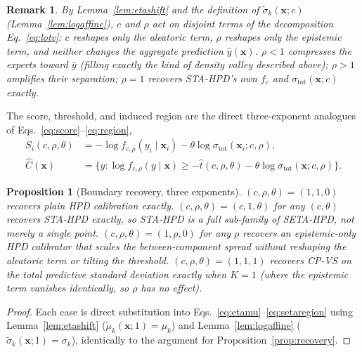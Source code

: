 \documentclass[10pt,twocolumn,a4paper]{article}
\newtheorem{proposition}{Proposition}
\newtheorem{remark}{Remark}
\begin{document}
\begin{remark}
By Lemma~\ref{lem:etashift} and the definition of $\tilde\sigma_k(\bm x;c)$ (Lemma~\ref{lem:logaffine}),
$c$ and $\rho$ act on disjoint terms of the decomposition Eq.~\eqref{eq:lotv}: $c$ reshapes only the
aleatoric term, $\rho$ reshapes only the epistemic term, and neither changes the aggregate
prediction $\hat y(\bm x)$. $\rho<1$ compresses the experts toward $\hat y$ (filling exactly the kind
of density valley described above); $\rho>1$ amplifies their separation; $\rho=1$ recovers STA-HPD's
own $f_c$ and $\sigma_{\mathrm{tot}}(\bm x;c)$ exactly.
\end{remark}

The score, threshold, and induced region are the direct three-exponent analogues of
Eqs.~\eqref{eq:score}--\eqref{eq:region},
\begin{align}
S_i(c,\rho,\theta) &= -\log f_{c,\rho}(y_i\mid\bm x_i) - \theta\log\sigma_{\mathrm{tot}}(\bm x_i;c,\rho), \label{eq:setascore}\\
\hat C(\bm x) &= \Big\{y:\log f_{c,\rho}(y\mid\bm x)\ge -\hat t(c,\rho,\theta) - \theta\log\sigma_{\mathrm{tot}}(\bm x;c,\rho)\Big\}. \label{eq:setaregion}
\end{align}

\begin{proposition}[Boundary recovery, three exponents]
\label{prop:setarecovery}
$(c,\rho,\theta)=(1,1,0)$ recovers plain HPD calibration exactly. $(c,\rho,\theta)=(c,1,\theta)$ for
any $(c,\theta)$ recovers STA-HPD exactly, so STA-HPD is a full sub-family of SETA-HPD, not merely a
single point. $(c,\rho,\theta)=(1,\rho,0)$ for any $\rho$ recovers an epistemic-only HPD calibrator
that scales the between-component spread without reshaping the aleatoric term or tilting the
threshold. $(c,\rho,\theta)=(1,1,1)$ recovers CP-VS on the total predictive standard deviation
exactly when $K=1$ (where the epistemic term vanishes identically, so $\rho$ has no effect).
\end{proposition}
\begin{proof}
Each case is direct substitution into Eqs.~\eqref{eq:etamu}--\eqref{eq:setaregion} using
Lemma~\ref{lem:etashift} ($\tilde\mu_k(\bm x;1)=\mu_k$) and Lemma~\ref{lem:logaffine}
($\tilde\sigma_k(\bm x;1)=\sigma_k$), identically to the argument for
Proposition~\ref{prop:recovery}.
\end{proof}
\end{document}
